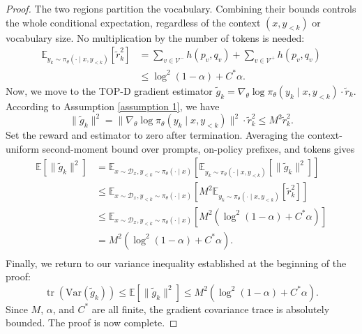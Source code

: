 \documentclass{article}
\theoremstyle{plain}
\theoremstyle{definition}
\theoremstyle{remark}
\begin{document}
\begin{proof}
	The two regions partition the vocabulary. Combining their bounds controls the whole conditional expectation, regardless of the context $(x,y_{<k})$ or vocabulary size. No multiplication by the number of tokens is needed:
	\begin{equation}
		\begin{split}
			\mathbb{E}_{y_k \sim \pi_\theta(\cdot \mid x, y_{<k})}\left[\tilde{r}_k^2\right]&=\sum_{v\in\mathcal{V}^-}h(p_v,q_v)+\sum_{v\in\mathcal{V}^+}h(p_v,q_v)\\
			&\leq\log^2(1-\alpha)+C^*\alpha.
		\end{split}
	\end{equation}
	Now, we move to the TOP-D gradient estimator $\tilde{g}_k = \nabla_\theta \log \pi_\theta(y_k \mid x, y_{<k}) \cdot \tilde{r}_k$. According to Assumption \ref{assumption 1}, we have
	\begin{equation}
		\lVert\tilde{g}_k\rVert^2 = \lVert\nabla_\theta \log \pi_\theta(y_k \mid x, y_{<k})\rVert^2 \cdot \tilde{r}_k^2 \leq M^2 \tilde{r}_k^2.
	\end{equation}
	Set the reward and estimator to zero after termination. Averaging the context-uniform second-moment bound over prompts, on-policy prefixes, and tokens gives
	\begin{equation}
		\begin{split}
			\mathbb{E}\left[\lVert\tilde{g}_k\rVert^2\right] &= \mathbb{E}_{x \sim \mathcal{D}_x, y_{<k} \sim \pi_\theta(\cdot \mid x)} \left[ \mathbb{E}_{y_k \sim \pi_\theta(\cdot \mid x, y_{<k})} \left[ \lVert\tilde{g}_k\rVert^2 \right] \right] \\
			&\leq\mathbb{E}_{x \sim \mathcal{D}_x, y_{<k} \sim \pi_\theta(\cdot \mid x)} \left[ M^2 \mathbb{E}_{y_k \sim \pi_\theta(\cdot \mid x, y_{<k})}\left[\tilde{r}_k^2\right]\right]\\
			&\leq\mathbb{E}_{x \sim \mathcal{D}_x, y_{<k} \sim \pi_\theta(\cdot \mid x)} \left[ M^2\left(\log^2(1-\alpha)+C^*\alpha\right)\right]\\
			&=M^2\left(\log^2(1-\alpha)+C^*\alpha\right).\\
		\end{split}
	\end{equation}
	Finally, we return to our variance inequality established at the beginning of the proof:
	\begin{equation}
		\operatorname{tr}(\mathrm{Var}(\tilde{g}_k)) \leq \mathbb{E}\left[\lVert\tilde{g}_k\rVert^2\right] \leq M^2\left(\log^2(1-\alpha)+C^*\alpha\right).
	\end{equation}
	Since $M$, $\alpha$, and $C^*$ are all finite, the gradient covariance trace is absolutely bounded. The proof is now complete.
\end{proof}
\end{document}
